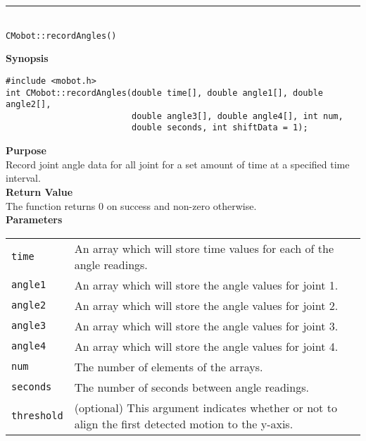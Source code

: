 \noindent
\vspace{5pt}
\rule{4.5in}{0.015in}\\
\noindent
{\LARGE \texttt{CMobot::recordAngles()}}\\
{}

\noindent
{\bf Synopsis}
\vspace{-8pt}
\begin{verbatim}
#include <mobot.h>
int CMobot::recordAngles(double time[], double angle1[], double angle2[], 
                         double angle3[], double angle4[], int num, 
                         double seconds, int shiftData = 1);
\end{verbatim}

\noindent
{\bf Purpose}\\
Record joint angle data for all joint for a set amount of time at a specified time interval.\\

\noindent
{\bf Return Value}\\
The function returns 0 on success and non-zero otherwise.\\

\noindent
{\bf Parameters}\\
\vspace{-0.1in}
\begin{description}
\item               
\begin{tabular}{p{15 mm}p{145 mm}}
\texttt{time} & An array which will store time values for each of the angle readings. \\
\texttt{angle1} & An array which will store the angle values for joint 1. \\
\texttt{angle2} & An array which will store the angle values for joint 2. \\
\texttt{angle3} & An array which will store the angle values for joint 3. \\
\texttt{angle4} & An array which will store the angle values for joint 4. \\
\texttt{num} & The number of elements of the arrays. \\
\texttt{seconds} & The number of seconds between angle readings. \\
\texttt{threshold} & (optional) This argument indicates whether or not to align the first
detected motion to the y-axis. 
\end{tabular}
\end{description}


